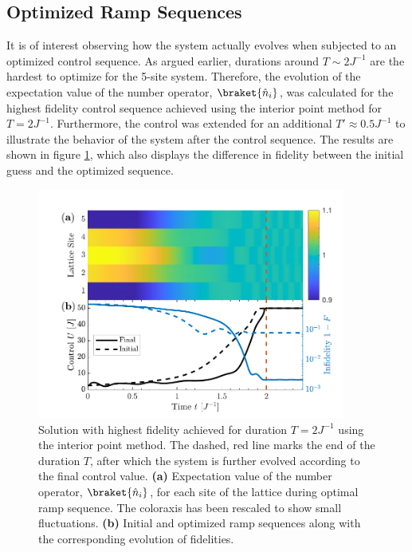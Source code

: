 \subsection{Optimized Ramp Sequences}
It is of interest observing how the system actually evolves when subjected to an optimized control sequence. As argued earlier, durations around $T \sim 2 J^{-1}$ are the hardest to optimize for the 5-site system. Therefore, the evolution of the expectation value of the number operator, $\braket{\hat{n}_i}$, was calculated for the highest fidelity control sequence achieved using the interior point method for $T = 2 J^{-1}$. Furthermore, the control was extended for an additional $T ' \approx 0.5 J^{-1}$ to illustrate the behavior of the system after the control sequence. The results are shown in figure \ref{fig:ExtendedRamp}, which also displays the difference in fidelity between the initial guess and the optimized sequence.
\begin{figure}[h!]
    \centering
    \includegraphics[width=0.9\textwidth]{Figures/L5/RampPlot.pdf}
    \caption{Solution with highest fidelity achieved for duration $T = 2 J^{-1}$ using the interior point method. The dashed, red line marks the end of the duration $T$, after which the system is further evolved according to the final control value. \textbf{(a)} Expectation value of the number operator, $\braket{\hat{n}_i}$, for each site of the lattice during optimal ramp sequence. The coloraxis has been rescaled to show small fluctuations. \textbf{(b)} Initial and optimized ramp sequences along with the corresponding evolution of fidelities.}
    \label{fig:ExtendedRamp}
\end{figure} 

